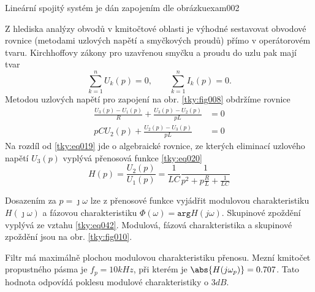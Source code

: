 \begin{tkyexam}{Lineární spojitý systém je dán zapojením dle obrázku}{exam002}
    {\centering
    \captionsetup{type=figure}
    \label{tky:fig009}
    \par}
  
  Z hlediska analýzy obvodů v kmitočtové oblasti je výhodné sestavovat obvodové rovnice (metodami
  uzlových napětí a smyčkových proudů) přímo v operátorovém tvaru. Kirchhoffovy zákony pro uzavřenou
  smyčku a proudu do uzlu pak mají tvar $$\sum_{k=1}^{n}U_k(p) = 0, \qquad \sum_{k=1}^{n}I_k(p) =
  0.$$ Metodou uzlových napětí pro zapojení na obr. \ref{tky:fig008} obdržíme rovnice
  \begin{align}
    \frac{U_3(p)-U_1(p)}{R}+\frac{U_3(p)-U_2(p)}{pL} &=  0 \\
    pCU_2(p) + \frac{U_2(p)-U_3(p)}{pL}              &=  0 
  \end{align}
  Na rozdíl od \ref{tky:eq019} jde o algebraické rovnice, ze kterých eliminací uzlového napětí
  $U_3(p)$ vyplývá přenosová funkce \ref{tky:eq020} $$H(p) = \frac{U_2(p)}{U_1(p)} =
  \frac{1}{LC}\frac{1}{p^2+p\frac{R}{L} + \frac{1}{LC}}$$
  
  {\centering
    \captionsetup{type=figure}
    \label{tky:fig010}
    \par}    
  
  Dosazením za $p=\jmath\omega$ lze z přenosové funkce vyjádřit modulovou charakteristiku
  $H(\jmath\omega)$ a fázovou charakteristiku $\Phi(\omega)= \texttt{arg} H(j\omega)$. Skupinové
  zpoždění vyplývá ze vztahu \ref{tky:eq042}. Modulová, fázová charakteristika a skupinové zpoždění
  jsou na obr. \ref{tky:fig010}.
  
  Filtr má maximálně plochou modulovou charakteristiku přenosu. Mezní kmitočet propustného pásma je
  $f_p = 10 kHz$, při kterém je $\abs{H(j\omega_p)}= 0.707$. Tato hodnota odpovídá poklesu modulové
  charakteristiky o $3 dB$.
    
  
  
\end{tkyexam}